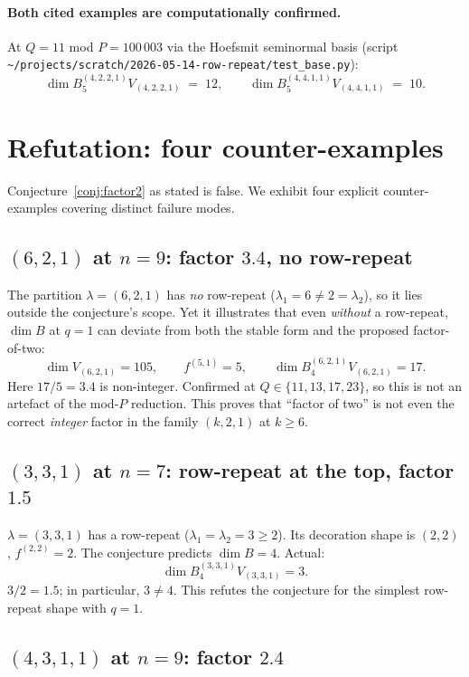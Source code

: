 \documentclass[11pt]{article}
\theoremstyle{definition}
\begin{document}
\paragraph{Both cited examples are computationally confirmed.}
At $Q = 11$ mod $P = 100\,003$ via the Hoefsmit seminormal basis (script
\texttt{\textasciitilde/projects/scratch/2026-05-14-row-repeat/test\_base.py}):
\[
   \dim B^{(4,2,2,1)}_5 V_{(4,2,2,1)} \;=\; 12, \qquad
   \dim B^{(4,4,1,1)}_5 V_{(4,4,1,1)} \;=\; 10.
\]

\section{Refutation: four counter-examples}\label{sec:refutation}

Conjecture~\ref{conj:factor2} as stated is false.  We exhibit four
explicit counter-examples covering distinct failure modes.

\subsection{$(6, 2, 1)$ at $n = 9$: factor $3.4$, no row-repeat}

The partition $\lambda = (6, 2, 1)$ has \emph{no} row-repeat
($\lambda_1 = 6 \ne 2 = \lambda_2$), so it lies outside the
conjecture's scope.  Yet it illustrates that even \emph{without} a
row-repeat, $\dim B$ at $q = 1$ can deviate from both the stable form
and the proposed factor-of-two:
\[
   \dim V_{(6,2,1)} = 105, \qquad f^{(5,1)} = 5, \qquad
   \dim B^{(6,2,1)}_4 V_{(6,2,1)} = 17.
\]
Here $17 / 5 = 3.4$ is non-integer.  Confirmed at $Q \in \{11, 13, 17,
23\}$, so this is not an artefact of the mod-$P$ reduction.  This
proves that ``factor of two'' is not even the correct \emph{integer}
factor in the family $(k, 2, 1)$ at $k \ge 6$.

\subsection{$(3, 3, 1)$ at $n = 7$: row-repeat at the top, factor $1.5$}

$\lambda = (3, 3, 1)$ has a row-repeat ($\lambda_1 = \lambda_2 = 3 \ge
2$).  Its decoration shape is $(2, 2)$, $f^{(2,2)} = 2$.  The
conjecture predicts $\dim B = 4$.  Actual:
\[
   \dim B^{(3,3,1)}_4 V_{(3,3,1)} = 3.
\]
$3/2 = 1.5$; in particular, $3 \ne 4$.  This refutes the conjecture for
the simplest row-repeat shape with $q = 1$.

\subsection{$(4, 3, 1, 1)$ at $n = 9$: factor $2.4$}
\end{document}
